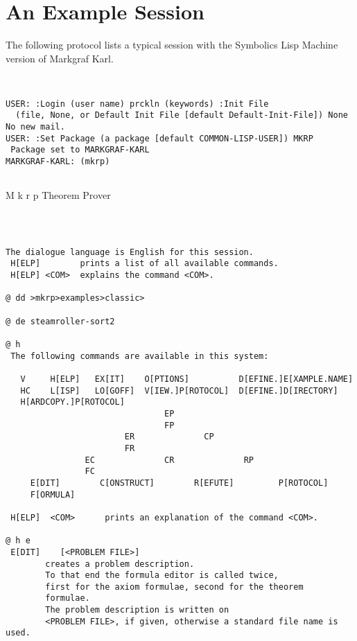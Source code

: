 \chapter{An Example Session} 
\label{AnExampleSession} 

The following protocol lists a typical session with the Symbolics Lisp Machine version of {\sc Markgraf Karl}.

{\small
\begin{verbatim}


USER: :Login (user name) prckln (keywords) :Init File 
  (file, None, or Default Init File [default Default-Init-File]) None
No new mail.
USER: :Set Package (a package [default COMMON-LISP-USER]) MKRP
 Package set to MARKGRAF-KARL
MARKGRAF-KARL: (mkrp)


\end{verbatim}

{\LARGE \sc M k r p \qquad     Theorem Prover}

\begin{verbatim}



The dialogue language is English for this session. 
 H[ELP]        prints a list of all available commands.
 H[ELP] <COM>  explains the command <COM>. 

@ dd >mkrp>examples>classic>

@ de steamroller-sort2

@ h
 The following commands are available in this system:

   V     H[ELP]   EX[IT]    O[PTIONS]          D[EFINE.]E[XAMPLE.NAME]
   HC    L[ISP]   LO[GOFF]  V[IEW.]P[ROTOCOL]  D[EFINE.]D[IRECTORY] 
   H[ARDCOPY.]P[ROTOCOL]
                                EP
                                FP
                        ER              CP
                        FR
                EC              CR              RP
                FC
     E[DIT]        C[ONSTRUCT]        R[EFUTE]         P[ROTOCOL] 
     F[ORMULA]

 H[ELP]  <COM>      prints an explanation of the command <COM>. 

@ h e
 E[DIT]    [<PROBLEM FILE>]
        creates a problem description. 
        To that end the formula editor is called twice,
        first for the axiom formulae, second for the theorem 
        formulae.
        The problem description is written on
        <PROBLEM FILE>, if given, otherwise a standard file name is used.


\end{verbatim}}

